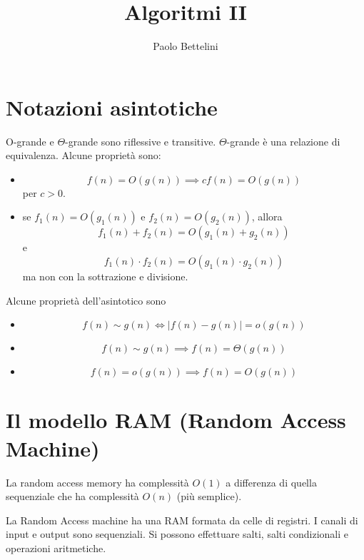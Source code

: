 \documentclass[a4paper]{article}
\title{Algoritmi II}
\author{Paolo Bettelini}
\date{}
\begin{document}
\maketitle
\tableofcontents

\section{Notazioni asintotiche}

O-grande e \(\Theta\)-grande sono riflessive e transitive.
\(\Theta\)-grande è una relazione di equivalenza.
Alcune proprietà sono:
\begin{itemize}
    \item \[
        f(n) = O(g(n)) \implies cf(n) = O(g(n))
    \]
    per \(c>0\).
    \item se \(f_1(n) = O(g_1(n))\) e \(f_2(n) = O(g_2(n))\), allora
    \[
        f_1(n) + f_2(n) = O(g_1(n) + g_2(n))
    \]
    e
    \[
        f_1(n) \cdot f_2(n) = O(g_1(n) \cdot g_2(n))
    \]
    ma non con la sottrazione e divisione.
\end{itemize}


Alcune proprietà dell'asintotico sono

\begin{itemize}
    \item \[
        f(n) \sim g(n) \iff |f(n) - g(n)| = o(g(n))
    \]
    \item \[
        f(n) \sim g(n) \implies f(n) = \Theta(g(n))
    \]
    \item \[
        f(n) = o(g(n)) \implies f(n) = O(g(n))
    \]
\end{itemize}

\section{Il modello RAM (Random Access Machine)}

La random access memory ha complessità \(O(1)\) a differenza di quella sequenziale che
ha complessità \(O(n)\) (più semplice).

La Random Access machine ha una RAM formata da celle di registri.
I canali di input e output sono sequenziali. Si possono effettuare salti, salti condizionali e operazioni aritmetiche.
\end{document}

